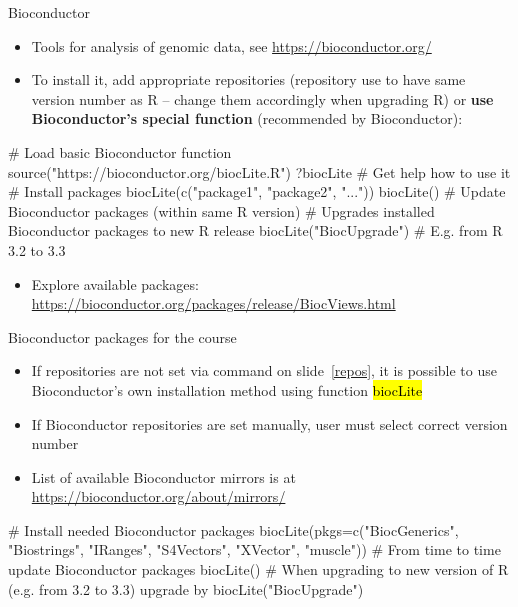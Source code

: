\documentclass[compress, ucs, xelatex, 11pt, xcolor=svgnames,
  hyperref={
    bookmarks=true,
    unicode=true,
    colorlinks=true,
    pdftitle={Molecular data in R},
    plainpages=false,
    pdfauthor={Vojtech Zeisek},
    pdfsubject={Course about phylogeny and evolution in R},
    pdfcreator={XeLaTeX},
    pdfkeywords={R, evolution, phylogeny, molecular data},
    linkcolor=Tomato,
    anchorcolor=SaddleBrown,
    citecolor=Goldenrod,
    filecolor=DarkMagenta,
    menucolor=Sienna,
    urlcolor=DarkTurquoise,
    pdftex},
  url={hyphens, lowtilde} %
  ]{beamer}
\renewcommand{\texttt}[1]{\hl{\ttfamily #1}}
\begin{document}
\begin{frame}[fragile]{Bioconductor}
  \begin{itemize}
    \item Tools for analysis of genomic data, see \url{https://bioconductor.org/}
    \item To install it, add appropriate repositories (repository use to have same version number as R -- change them accordingly when upgrading R) or \textbf{use Bioconductor's special function} (recommended by Bioconductor):
  \end{itemize}
  \begin{spluscode}
    # Load basic Bioconductor function
    source("https://bioconductor.org/biocLite.R")
    ?biocLite # Get help how to use it
    # Install packages
    biocLite(c("package1", "package2", "..."))
    biocLite() # Update Bioconductor packages (within same R version)
    # Upgrades installed Bioconductor packages to new R release
    biocLite("BiocUpgrade") # E.g. from R 3.2 to 3.3
  \end{spluscode}
\begin{itemize}
 \item Explore available packages: \url{https://bioconductor.org/packages/release/BiocViews.html}
\end{itemize}
\end{frame}

\begin{frame}[fragile]{Bioconductor packages for the course}
  \begin{itemize}
    \item If repositories are not set via command on slide~\ref{repos}, it is possible to use Bioconductor's own installation method using function \texttt{biocLite}
    \item If Bioconductor repositories are set manually, user must select correct version number
    \item List of available Bioconductor mirrors is at \url{https://bioconductor.org/about/mirrors/}%
  \end{itemize}
  \begin{spluscode}
    # Install needed Bioconductor packages
    biocLite(pkgs=c("BiocGenerics", "Biostrings", "IRanges", "S4Vectors",
      "XVector", "muscle"))
    # From time to time update Bioconductor packages
    biocLite()
    # When upgrading to new version of R (e.g. from 3.2 to 3.3) upgrade by
    biocLite("BiocUpgrade")
  \end{spluscode}
\end{frame}
\end{document}

